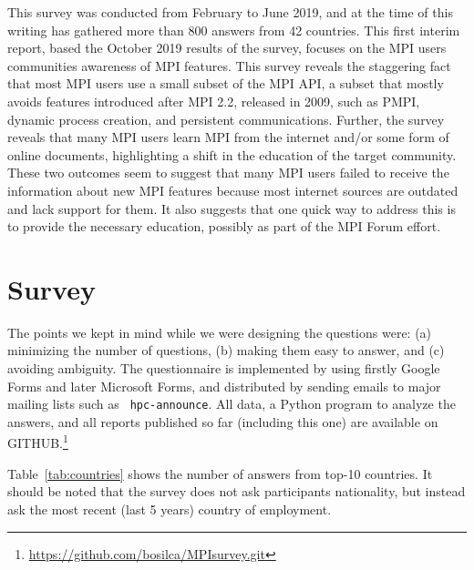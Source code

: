 \documentclass[sigconf,nonacm]{acmart}
\begin{document}
This survey was conducted from February to June 2019, and at the time of
this writing has gathered more than 800 answers from 42 countries.
%
This first interim report, based the October 2019 results of the survey,
focuses on the MPI users communities awareness of MPI features.
%
This survey reveals the staggering fact that most MPI users use a small subset
of the MPI API, a subset that mostly avoids features introduced after MPI 2.2,
released in 2009, such as PMPI, dynamic process creation, and persistent
communications. Further, the survey reveals that many MPI users learn MPI
from the internet and/or some form of online documents, highlighting a shift in
the education of the target community.
%
These two outcomes seem to suggest that many MPI users failed to receive the
information about new MPI features because most internet sources are outdated
and lack support for them. It also suggests that one quick way to address this
is to provide the necessary education, possibly as part of the MPI Forum effort.

\section{Survey}

The points we kept in mind while we were designing the questions were: (a)
minimizing the number of questions, (b) making them easy to answer, and (c) avoiding ambiguity. The
questionnaire is implemented by using firstly Google Forms and later Microsoft
Forms, and distributed by sending emails to major mailing lists such as {\tt
hpc-announce}. All data, a Python program to analyze the answers, and all
reports published so far (including this one) are available on
GITHUB.\footnote{\url{https://github.com/bosilca/MPIsurvey.git}}

Table~\ref{tab:countries} shows the number of answers from top-10 countries. It
should be noted that the survey does not ask participants nationality, but
instead ask the most recent (last 5 years) country of employment.
\vspace{-3mm}
\end{document}
